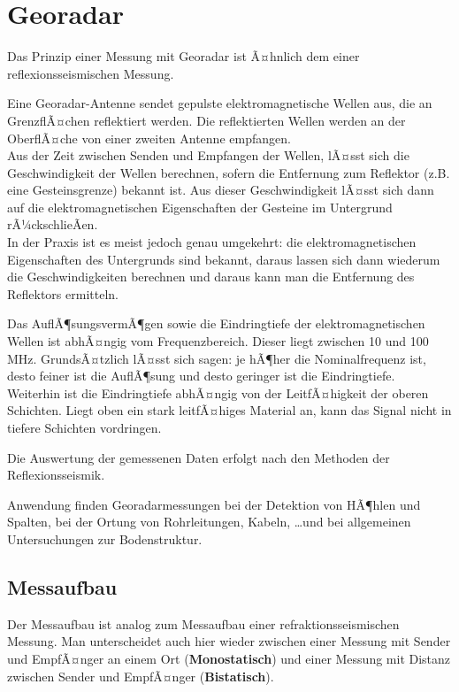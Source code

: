 \chapter{Georadar}

Das Prinzip einer Messung mit Georadar ist Ã¤hnlich dem einer reflexionsseismischen Messung. 

Eine Georadar-Antenne sendet gepulste elektromagnetische Wellen aus, die an GrenzflÃ¤chen reflektiert werden. Die reflektierten Wellen werden an der OberflÃ¤che von einer zweiten Antenne empfangen.\\ 
Aus der Zeit zwischen Senden und Empfangen der Wellen, lÃ¤sst sich die Geschwindigkeit der Wellen berechnen, sofern die Entfernung zum Reflektor (z.B. eine Gesteinsgrenze) bekannt ist. Aus dieser Geschwindigkeit lÃ¤sst sich dann auf die elektromagnetischen Eigenschaften der Gesteine im Untergrund rÃ¼ckschlieÃen.\\ 
In der Praxis ist es meist jedoch genau umgekehrt: die elektromagnetischen Eigenschaften des Untergrunds sind bekannt, daraus lassen sich dann wiederum die Geschwindigkeiten berechnen und daraus kann man die Entfernung des Reflektors ermitteln. 

Das AuflÃ¶sungsvermÃ¶gen sowie die Eindringtiefe der elektromagnetischen Wellen ist abhÃ¤ngig vom Frequenzbereich. Dieser liegt zwischen 10 und 100\,\si{MHz}. GrundsÃ¤tzlich lÃ¤sst sich sagen: je hÃ¶her die Nominalfrequenz ist, desto feiner ist die AuflÃ¶sung und desto geringer ist die Eindringtiefe. \\
Weiterhin ist die Eindringtiefe abhÃ¤ngig von der LeitfÃ¤higkeit der oberen Schichten. Liegt oben ein stark leitfÃ¤higes Material an, kann das Signal nicht in tiefere Schichten vordringen. 

Die Auswertung der gemessenen Daten erfolgt nach den Methoden der Reflexionsseismik.

Anwendung finden Georadarmessungen bei der Detektion von HÃ¶hlen und Spalten, bei der Ortung von Rohrleitungen, Kabeln, \dots und bei allgemeinen Untersuchungen zur Bodenstruktur.

\section{Messaufbau}
Der Messaufbau ist analog zum Messaufbau einer refraktionsseismischen Messung. Man unterscheidet auch hier wieder zwischen einer Messung mit Sender und EmpfÃ¤nger an einem Ort (\textbf{Monostatisch}) und einer Messung mit Distanz zwischen Sender und EmpfÃ¤nger (\textbf{Bistatisch}).


